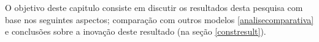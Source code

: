 O objetivo deste capitulo consiste em discutir os resultados desta pesquisa com base nos seguintes aspectos; comparação com outros modelos \ref{analisecomparativa} e conclusões sobre a inovação deste resultado (na seção \ref{constresult}).